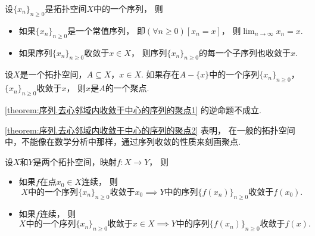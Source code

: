 \begin{theorem}
设\(\{x_n\}_{n\geq0}\)是拓扑空间\(X\)中的一个序列，
则\begin{itemize}
	\item 如果\(\{x_n\}_{n\geq0}\)是一个常值序列，
	即\((\forall n\geq0)[x_n=x]\)，
	则\(\lim_{n\to\infty} x_n = x\).
	\item 如果序列\(\{x_n\}_{n\geq0}\)收敛于\(x \in X\)，
	则序列\(\{x_n\}_{n\geq0}\)的每一个子序列也收敛于\(x\).
\end{itemize}
\end{theorem}

\begin{theorem}\label{theorem:序列.去心邻域内收敛于中心的序列的聚点1}
设\(X\)是一个拓扑空间，\(A \subseteq X\)，\(x \in X\).
如果存在\(A-\{x\}\)中的一个序列\(\{x_n\}_{n\geq0}\)，
\(\{x_n\}_{n\geq0}\)收敛于\(x\)，
则\(x\)是\(A\)的一个聚点.
\end{theorem}

\begin{proposition}\label{theorem:序列.去心邻域内收敛于中心的序列的聚点2}
\cref{theorem:序列.去心邻域内收敛于中心的序列的聚点1} 的逆命题不成立.
\end{proposition}

\cref{theorem:序列.去心邻域内收敛于中心的序列的聚点2} 表明，
在一般的拓扑空间中，不能像在数学分析中那样，通过序列收敛的性质来刻画聚点.

\begin{theorem}\label{theorem:序列.连续映射的定义域中的序列与值域中的序列之间的关系1}
设\(X\)和\(Y\)是两个拓扑空间，映射\(f\colon X \to Y\)，
则\begin{itemize}
	\item 如果\(f\)在点\(x_0 \in X\)连续，
	则\[
		\text{$X$中的一个序列$\{x_n\}_{n\geq0}$收敛于$x_0$}
		\implies
		\text{$Y$中的序列$\{f(x_n)\}_{n\geq0}$收敛于$f(x_0)$}.
	\]

	\item 如果\(f\)连续，
	则\[
		\text{$X$中的一个序列$\{x_n\}_{n\geq0}$收敛于$x \in X$}
		\implies
		\text{$Y$中的序列$\{f(x_n)\}_{n\geq0}$收敛于$f(x)$}.
	\]
\end{itemize}
\end{theorem}

